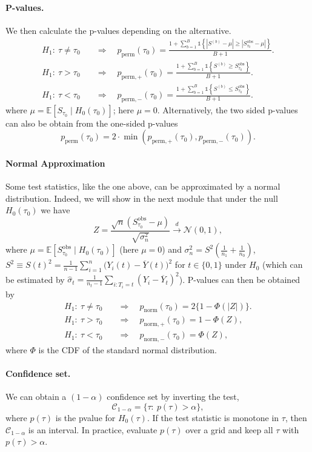 \documentclass[11pt]{exam}
\theoremstyle{plain}
\newcommand{\indicator}[1]{\mathds{1}{\left\{ #1 \right\}}}
\newcommand{\indist}{\overset{d}{\to}}
\newcommand{\Nb}[1]{\mathcal{N}{\left( #1 \right)}}
\newcommand{\E}{\mathbb{E}}
\begin{document}
\paragraph{P-values.}
We then calculate the p-values depending on the alternative.
\begin{align*}
H_1:\ \tau \neq \tau_0 &\quad\Rightarrow\quad
p_{\text{perm}}(\tau_0)=\frac{1+\sum_{b=1}^B \indicator{|S^{(b)}-\mu|\ge|S_{\tau_0}^{\text{obs}}-\mu|}}{B+1}. \\[2mm]
H_1:\ \tau>\tau_0 &\quad\Rightarrow\quad
p_{\text{perm},+}(\tau_0)=\frac{1+\sum_{b=1}^B \indicator{S^{(b)} \ge S_{\tau_0}^{\text{obs}}}}{B+1}.\\[2mm]
H_1:\ \tau<\tau_0 &\quad\Rightarrow\quad
p_{\text{perm},-}(\tau_0)=\frac{1+\sum_{b=1}^B \indicator{S^{(b)} \le S_{\tau_0}^{\text{obs}}}}{B+1}.
\end{align*}
where $\mu = \E[S_{\tau_0} \mid H_0(\tau_0)]$; here $\mu = 0$.
Alternatively, the two sided p-values can also be obtain from the one-sided p-values
\[
p_{\text{perm}}(\tau_0) = 2 \cdot \min(p_{\text{perm},+}(\tau_0), p_{\text{perm},-}(\tau_0)).
\]

\paragraph{Normal Approximation}
Some test statistics, like the one above, can be approximated by a normal distribution. Indeed, we will show in the next module that under the null $H_0(\tau_0)$ we have
\[
Z=\frac{\sqrt{n}(S^{\text{obs}}_{\tau_0} - \mu)}{\sqrt{\sigma_n^2}} \indist \Nb{0, 1},
\]
where $\mu = \E[S^{\text{obs}}_{\tau_0}\mid H_0(\tau_0)]$ (here $\mu = 0$) and $\sigma_n^2 = S^2\left(\frac{1}{n_1} + \frac{1}{n_0}\right)$, $S^2 \equiv S(t)^2=\frac{1}{n-1}\sum_{i=1}^n\big(Y_i(t)-\overline{Y}(t)\big)^2$ for $t \in \{0, 1\}$ under $H_0$ (which can be estimated by $\hat\sigma_t = \frac{1}{n_t - 1} \sum_{i:T_i = t} (Y_i - \overline{Y}_t)^2$). P-values can then be obtained by
\begin{align*}
H_1:\ \tau \neq \tau_0 &\quad\Rightarrow\quad p_{\text{norm}}(\tau_0)=2\{1-\Phi(|Z|)\}.\\[2mm]
H_1:\ \tau>\tau_0 &\quad\Rightarrow\quad p_{\text{norm},+}(\tau_0)=1-\Phi(Z),\\[2mm]
H_1:\ \tau<\tau_0 &\quad\Rightarrow\quad p_{\text{norm},-}(\tau_0)=\Phi(Z),
\end{align*}
where $\Phi$ is the CDF of the standard normal distribution.

\paragraph{Confidence set.}
We can obtain a $(1-\alpha)$ confidence set by inverting the test,
\[
\mathcal C_{1-\alpha}=\{\tau:\ p(\tau)>\alpha\},
\]
where \(p(\tau)\) is the p\textendash value for \(H_0(\tau)\).
If the test statistic is monotone in \(\tau\), then \(\mathcal C_{1-\alpha}\) is an interval.
In practice, evaluate $p(\tau)$ over a grid and keep all $\tau$ with $p(\tau) > \alpha$.
\end{document}

